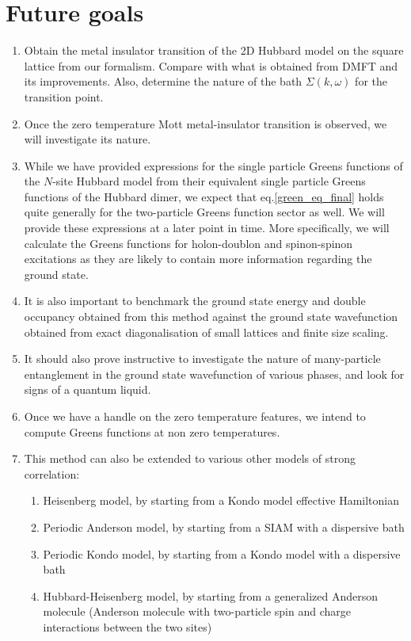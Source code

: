 \documentclass{article}
\numberwithin{equation}{section}
\begin{document}
\section{Future goals}
\begin{enumerate}
\item Obtain the metal insulator transition of the 2D Hubbard model on the square lattice from our formalism. Compare with what is obtained from DMFT and its improvements. Also, determine the nature of the bath $\Sigma (k,\omega)$ for the transition point.

\item Once the zero temperature Mott metal-insulator transition is observed, we will investigate its nature.

\item While we have provided expressions for the single particle Greens functions of the $N$-site Hubbard model from their equivalent single particle Greens functions of the Hubbard dimer, we expect that eq.\eqref{green_eq_final} holds quite generally for the two-particle Greens function sector as well. We will provide these expressions at a later point in time. More specifically, we will calculate the Greens functions for holon-doublon and spinon-spinon excitations as they are likely to contain more information regarding the ground state.

\item It is also important to benchmark the ground state energy and double occupancy obtained from this method against the ground state wavefunction obtained from exact diagonalisation of small lattices and finite size scaling.

\item It should also prove instructive to investigate the nature of many-particle entanglement in the ground state wavefunction of various phases, and  look for signs of a quantum liquid.

\item Once we have a handle on the zero temperature features, we intend to compute Greens functions at non zero temperatures.

\item This method can also be extended to various other models of strong correlation:
	\begin{enumerate}
		\item Heisenberg model, by starting from a Kondo model effective Hamiltonian
		\item Periodic Anderson model, by starting from a SIAM with a dispersive bath
		\item Periodic Kondo model, by starting from a Kondo model with a dispersive bath
		\item Hubbard-Heisenberg model, by starting from a generalized Anderson molecule (Anderson molecule with two-particle spin and charge interactions between the two sites)
	\end{enumerate}
\end{enumerate}
\end{document}
